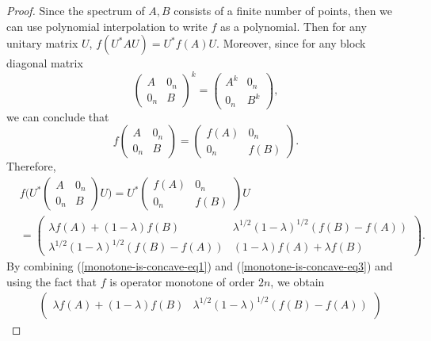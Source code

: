 \documentclass[12pt,a4paper]{amsart}
\theoremstyle{definition}
\begin{document}
\begin{proof}
		Since the  spectrum of $A, B$ consists of a finite number of points, then we can use polynomial interpolation to write $f$ as a polynomial.   Then for any unitary matrix $U$, $f(U^{*}AU) = U^{*}f(A)U$. Moreover, since for any block diagonal matrix
		\[ 	
		\begin{pmatrix}
			A &  0_n  \\
			0_n &  B
		\end{pmatrix}^{k} 
		= 	 	
		\begin{pmatrix}
			A^{k} &  0_n  \\
			0_n &  B^{k}
		\end{pmatrix}, 
		\]
		we can conclude that
		\begin{equation*}
			f\begin{pmatrix}
				A &  0_n  \\
				0_n &  B
			\end{pmatrix}
			= 	 	
			\begin{pmatrix}
				f(A) &  0_n  \\
				0_n &  f(B)
			\end{pmatrix}.
		\end{equation*} 
		Therefore, 
		\begin{equation}\label{monotone-is-concave-eq3}
			\begin{split}
				&f \bigg(  U^{*} 	\begin{pmatrix}
					A &   0_n \\
					0_n & B
				\end{pmatrix}  U \bigg) = U^{*} \begin{pmatrix}
					f(A) &   0_n \\
					0_n & f(B)
				\end{pmatrix} U \\
				&= \begin{pmatrix}
					\lambda f(A) + (1- \lambda)f(B) &   \lambda^{1/2}(1- \lambda)^{1/2}(f(B) - f(A))  \\
					\lambda^{1/2}(1- \lambda)^{1/2}(f(B) - f(A)) & (1- \lambda)f(A) + \lambda f(B)
				\end{pmatrix}.
			\end{split}
		\end{equation}
		By combining (\ref{monotone-is-concave-eq1}) and (\ref{monotone-is-concave-eq3}) and using the fact that $f$ is operator monotone of order $2n$, 
		we obtain
		\begin{align*}
			&\begin{pmatrix}
				\lambda f(A) + (1- \lambda)f(B) &   \lambda^{1/2}(1- \lambda)^{1/2}(f(B) - f(A))  \\

\end{pmatrix}
\end{align*}
\end{proof}
\end{document}
